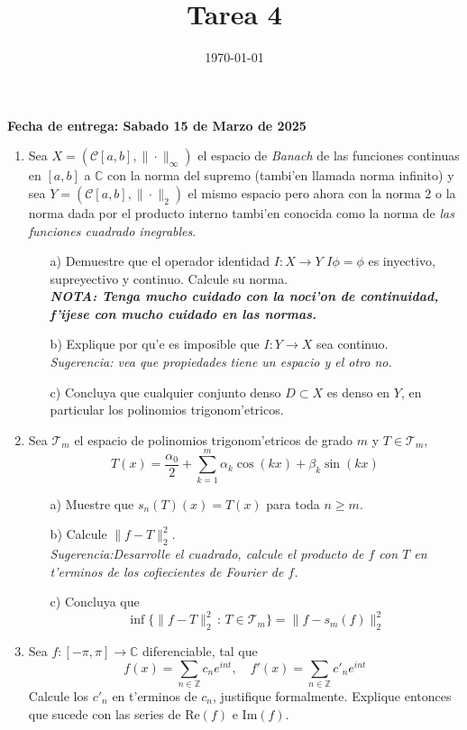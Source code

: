 \documentclass[letterpaper]{article}
\date{\today}
\title{Tarea 4}
\newcommand{\zah}{\ensuremath{ \mathbb Z }}
\newcommand{\co}{\ensuremath{\mathbb C }}
\begin{document}
\maketitle

\textbf{Fecha de entrega: Sabado 15 de Marzo de 2025}

\begin{enumerate}
  \item Sea \(X=(\mathcal{C}[a,b],\|\cdot\|_{\infty})\) el espacio de \emph{Banach} de las funciones continuas en \([a,b]\) a \(\co\) con la norma del supremo (tambi'en llamada norma infinito) y sea \(Y=(\mathcal{C}[a,b],\|\cdot\|_{2})\) el mismo espacio pero ahora con la norma 2 o la norma dada por el producto interno tambi'en conocida como la norma de \emph{las funciones cuadrado inegrables}.
        \begin{itemize}
          \item[a)] Demuestre que el operador identidad \(I:X\to Y\) \(I\phi=\phi\) es inyectivo, supreyectivo y continuo. Calcule su norma.\\
            \emph{\textbf{NOTA: Tenga mucho cuidado con la noci'on de continuidad, f'ijese con mucho cuidado en las normas.}}
          \item[b)] Explique por qu'e es imposible que \(I:Y\to X\) sea continuo.\\
            \emph{Sugerencia: vea que propiedades tiene un espacio y el otro no.}
          \item[c)] Concluya que cualquier conjunto denso \(D\subset X\) es denso en \(Y\), en particular los polinomios trigonom'etricos.
        \end{itemize}
  \item Sea \(\mathcal{T}_{m}\) el espacio de polinomios trigonom'etricos de grado \(m\) y \(T\in\mathcal{T}_{m}\),
        \[
        T(x)=\frac{\alpha_{0}}{2}+\sum_{k=1}^{m}\alpha_{k}\cos(kx)+\beta_{k}\sin(kx)
        \]
        \begin{itemize}
          \item[a)] Muestre que \(s_{n}(T)(x)=T(x)\) para toda \(n\geq m\).
          \item[b)] Calcule \(\|f-T\|^{2}_{2}\).\\
                \emph{Sugerencia:Desarrolle el cuadrado, calcule el producto de \(f\) con \(T\) en t'erminos de los cofiecientes de Fourier de \(f\).}
          \item[c)] Concluya que
                \[
                \inf\{\|f-T\|^{2}_{2}\,:\,T\in\mathcal{T}_{m}\}=\|f-s_{m}(f)\|^{2}_{2}
                \]
        \end{itemize}
  \item Sea \(f:[-\pi,\pi]\to\co\) diferenciable, tal que
        \[
        f(x)=\sum_{n\in\zah}c_{n}e^{int},\quad f'(x)=\sum_{n\in\zah}c'_{n}e^{int}
        \]
        Calcule los \(c'_{n}\) en t'erminos de \(c_{n}\), justifique formalmente. Explique entonces que sucede con las series de \(\mathrm{Re}(f)\) e \(\mathrm{Im}(f)\).
\end{enumerate}
\end{document}
